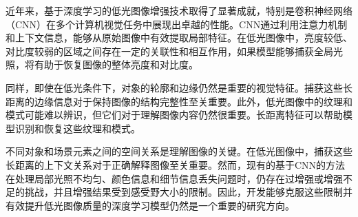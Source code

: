 \documentclass[a4paper, 10pt]{article}
\begin{document}
		
		近年来，基于深度学习的低光图像增强技术取得了显著成就，特别是卷积神经网络（CNN）在多个计算机视觉任务中展现出卓越的性能。CNN通过利用注意力机制\cite{yang2021locally,zhang2020attention}和上下文信息，能够从原始图像中有效提取局部特征\cite{jain1991unsupervised, lowe2004distinctive, ojala2002multiresolution}。在低光图像中，亮度较低、对比度较弱的区域之间存在一定的关联性和相互作用，如果模型能够捕获全局光照，将有助于恢复图像的整体亮度和对比度。
		
		同样，即使在低光条件下，对象的轮廓和边缘仍然是重要的视觉特征。捕获这些长距离的边缘信息对于保持图像的结构完整性至关重要。此外，低光图像中的纹理和模式可能难以辨识，但它们对于理解图像内容仍然很重要。长距离特征可以帮助模型识别和恢复这些纹理和模式。
		
		不同对象和场景元素之间的空间关系是理解图像的关键。在低光图像中，捕获这些长距离的上下文关系对于正确解释图像至关重要。然而，现有的基于CNN的方法在处理局部光照不均匀、颜色信息和细节信息丢失问题时，仍存在过增强或增强不足的挑战，并且增强结果受到感受野大小的限制。因此，开发能够克服这些限制并有效提升低光图像质量的深度学习模型仍然是一个重要的研究方向。
		
%		
%		
%		
%		
\end{document}
